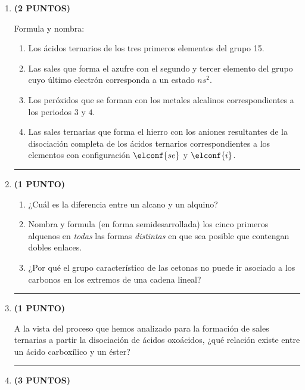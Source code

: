 \documentclass[a4paper,14pt]{extarticle}
\newcommand{\halmos}{
\vspace*{-3ex}

\begin{flushright}
\rule{1mm}{2.5mm} \end{flushright}
}
\renewcommand{\qed}{\halmos}
\begin{document}
\begin{enumerate}
  \setlength\itemsep{1.5em}
    
    
    \item \textbf{(2 PUNTOS)} 
    
    Formula y nombra:
    		\begin{enumerate}[label=\alph*)]
    			\item Los ácidos ternarios de los tres primeros elementos del grupo 15.
    			\item Las sales que forma el azufre con el segundo y tercer elemento del grupo cuyo último electrón corresponda a un estado $ns^2$.
    			\item Los peróxidos que se forman con los metales alcalinos correspondientes a los periodos $3$ y $4$. 
    			\item Las sales ternarias que forma el hierro con los aniones resultantes de la disociación completa de los ácidos ternarios correspondientes a los elementos con configuración $\elconf{se}$ y $\elconf{i}$.
    		\end{enumerate}
    		\qed
    	
    \item \textbf{(1 PUNTO)}
    
    	\begin{enumerate}[label=\alph*)]
    		\item ¿Cuál es la diferencia entre un alcano y un alquino?
    		\item  Nombra y formula (en forma semidesarrollada) los cinco primeros alquenos en \textit{todas} las formas \textit{distintas} en que sea posible que contengan dobles enlaces.
    		\item ¿Por qué el grupo característico de las cetonas no puede ir asociado a los carbonos en los extremos de una cadena lineal?
    	\end{enumerate} 
    \qed
    
    
    \item \textbf{(1 PUNTO)}
    
     A la vista del proceso que hemos analizado para la formación de sales ternarias a partir la disociación de ácidos oxoácidos, ¿qué relación existe entre un ácido carboxílico y un éster? 
    \qed
    
    
    \item \textbf{(3 PUNTOS)} 
    

\end{enumerate}
\end{document}
